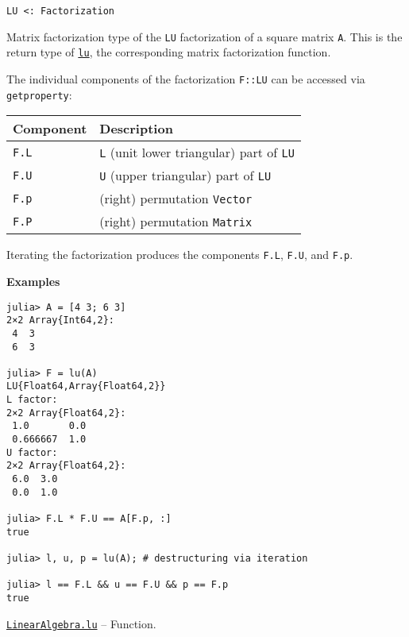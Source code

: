 \begin{adjustwidth}{2em}{0pt}


\begin{verbatim}
LU <: Factorization
\end{verbatim}

Matrix factorization type of the \texttt{LU} factorization of a square matrix \texttt{A}. This is the return type of \hyperlink{5672569096214810830}{\texttt{lu}}, the corresponding matrix factorization function.

The individual components of the factorization \texttt{F::LU} can be accessed via \texttt{getproperty}:


\begin{table}[h]

\begin{tabulary}{\linewidth}{|L|L|}
\hline
Component & Description \\
\hline
\texttt{F.L} & \texttt{L} (unit lower triangular) part of \texttt{LU} \\
\hline
\texttt{F.U} & \texttt{U} (upper triangular) part of \texttt{LU} \\
\hline
\texttt{F.p} & (right) permutation \texttt{Vector} \\
\hline
\texttt{F.P} & (right) permutation \texttt{Matrix} \\
\hline
\end{tabulary}

\end{table}

Iterating the factorization produces the components \texttt{F.L}, \texttt{F.U}, and \texttt{F.p}.

\textbf{Examples}


\begin{verbatim}
julia> A = [4 3; 6 3]
2×2 Array{Int64,2}:
 4  3
 6  3

julia> F = lu(A)
LU{Float64,Array{Float64,2}}
L factor:
2×2 Array{Float64,2}:
 1.0       0.0
 0.666667  1.0
U factor:
2×2 Array{Float64,2}:
 6.0  3.0
 0.0  1.0

julia> F.L * F.U == A[F.p, :]
true

julia> l, u, p = lu(A); # destructuring via iteration

julia> l == F.L && u == F.U && p == F.p
true
\end{verbatim}



\end{adjustwidth}
\hypertarget{5672569096214810830}{} 
\hyperlink{5672569096214810830}{\texttt{LinearAlgebra.lu}}  -- {Function.}

